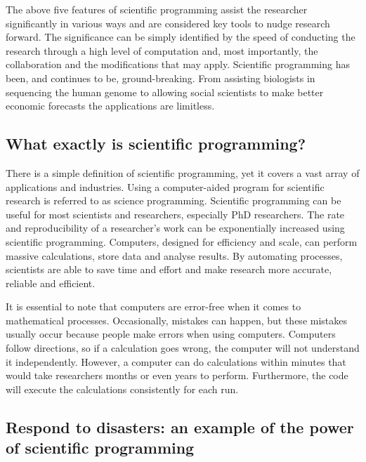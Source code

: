 \documentclass[
]{book}
\begin{document}
The above five features of scientific programming assist the researcher significantly in various ways and are considered key tools to nudge research forward. The significance can be simply identified by the speed of conducting the research through a high level of computation and, most importantly, the collaboration and the modifications that may apply. Scientific programming has been, and continues to be, ground-breaking. From assisting biologists in sequencing the human genome to allowing social scientists to make better economic forecasts the applications are limitless.

\hypertarget{what-exactly-is-scientific-programming}{%
\subsection*{What exactly is scientific programming?}\label{what-exactly-is-scientific-programming}}

There is a simple definition of scientific programming, yet it covers a vast array of applications and industries. Using a computer-aided program for scientific research is referred to as science programming. Scientific programming can be useful for most scientists and researchers, especially PhD researchers. The rate and reproducibility of a researcher's work can be exponentially increased using scientific programming. Computers, designed for efficiency and scale, can perform massive calculations, store data and analyse results. By automating processes, scientists are able to save time and effort and make research more accurate, reliable and efficient.

It is essential to note that computers are error-free when it comes to mathematical processes. Occasionally, mistakes can happen, but these mistakes usually occur because people make errors when using computers. Computers follow directions, so if a calculation goes wrong, the computer will not understand it independently. However, a computer can do calculations within minutes that would take researchers months or even years to perform. Furthermore, the code will execute the calculations consistently for each run.

\hypertarget{respond-to-disasters-an-example-of-the-power-of-scientific-programming}{%
\subsection*{Respond to disasters: an example of the power of scientific programming}\label{respond-to-disasters-an-example-of-the-power-of-scientific-programming}}
\end{document}
